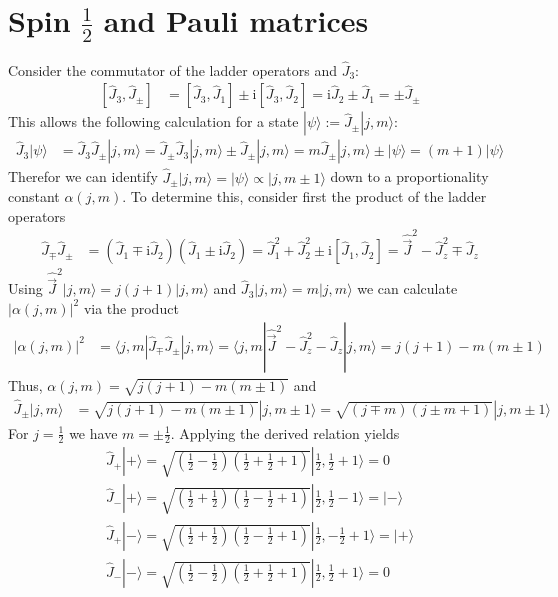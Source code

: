 \documentclass[english, parskip=full]{scrartcl}
\newcommand{\braket}{}
\newcommand{\kla}{}
\newcommand{\klam}{}
\newcommand{\Ket}{}
\def\I{\text{i}}
\begin{document}
\section{Spin $\frac{1}{2}$ and Pauli matrices}
Consider the commutator of the ladder operators and $\hat{J}_3$:
\begin{align*}
\klam\left[ {\hat{J}_3,\hat{J}_\pm} \right]&=\klam\left[ {\hat{J}_3,\hat{J}_1} \right]\pm\I\klam\left[ {\hat{J}_3,\hat{J}_2} \right]=\I\hat{J}_2\pm\hat{J}_1=\pm\hat{J}_\pm
\end{align*}
This allows the following calculation for a state $\Ket | {\psi} \rangle:=\hat{J}_\pm\Ket | {j,m} \rangle$:
\begin{align*}
\hat{J}_3\Ket | {\psi} \rangle&=\hat{J}_3\hat{J}_\pm\Ket | {j,m} \rangle=\hat{J}_\pm\hat{J}_3\Ket | {j,m} \rangle\pm\hat{J}_\pm\Ket | {j,m} \rangle=m\hat{J}_\pm\Ket | {j,m} \rangle\pm\Ket | {\psi} \rangle=(m+1)\Ket | {\psi} \rangle
\end{align*}
Therefor we can identify $\hat{J}_\pm\Ket | {j,m} \rangle=\Ket | {\psi} \rangle\propto\Ket | {j,m\pm 1} \rangle$ down to a proportionality constant $\alpha(j,m)$. To determine this, consider first the product of the ladder operators
\begin{align*}
\hat{J}_\mp\hat{J}_\pm&=(\hat{J}_1\mp\I\hat{J}_2)(\hat{J}_1\pm\I\hat{J}_2)=\hat{J}_1^2+\hat{J}_2^2\pm\I\klam\left[ {\hat{J}_1,\hat{J}_2} \right]=\hat{\vec{J}}^2-\hat{J}_z^2\mp\hat{J}_z
\end{align*}
Using $\hat{\vec{J}}^2\Ket | {j,m} \rangle=j(j+1)\Ket | {j,m} \rangle$ and $\hat{J}_3\Ket | {j,m} \rangle=m\Ket | {j,m} \rangle$ we can calculate $|\alpha(j,m)|^2$ via the product
\begin{align*}
|\alpha(j,m)|^2&=\braket\langle {j,m} | {\hat{J}_\mp\hat{J}_\pm} | {j,m}\rangle=\braket\langle {j,m} | {\hat{\vec{J}}^2-\hat{J}_z^2-\hat{J}_z} | {j,m}\rangle=j(j+1)-m(m\pm 1)
\end{align*}
Thus, $\alpha(j,m)=\sqrt{j(j+1)-m(m\pm 1)}$ and
\begin{align*}
\hat{J}_\pm\Ket | {j,m} \rangle&=\sqrt{j(j+1)-m(m\pm 1)}\Ket | {j,m\pm 1} \rangle=\sqrt{(j\mp m)(j\pm m+1)}\Ket | {j,m\pm 1} \rangle
\end{align*}
For $j=\frac{1}{2}$ we have $m=\pm\frac{1}{2}$. Applying the derived relation yields
\begin{align*}
\hat{J}_+\Ket | {+} \rangle=\sqrt{\kla\left( {\frac{1}{2}-\frac{1}{2}} \right)\kla\left( {\frac{1}{2}+\frac{1}{2}+1} \right)}\Ket | {\frac{1}{2},\frac{1}{2}+ 1} \rangle=0\\
\hat{J}_-\Ket | {+} \rangle=\sqrt{\kla\left( {\frac{1}{2}+\frac{1}{2}} \right)\kla\left( {\frac{1}{2}-\frac{1}{2}+1} \right)}\Ket | {\frac{1}{2},\frac{1}{2}- 1} \rangle=\Ket | {-} \rangle\\
\hat{J}_+\Ket | {-} \rangle=\sqrt{\kla\left( {\frac{1}{2}+\frac{1}{2}} \right)\kla\left( {\frac{1}{2}-\frac{1}{2}+1} \right)}\Ket | {\frac{1}{2},-\frac{1}{2}+ 1} \rangle=\Ket | {+} \rangle\\
\hat{J}_-\Ket | {-} \rangle=\sqrt{\kla\left( {\frac{1}{2}-\frac{1}{2}} \right)\kla\left( {\frac{1}{2}+\frac{1}{2}+1} \right)}\Ket | {\frac{1}{2},\frac{1}{2}+ 1} \rangle=0
\end{align*}
\end{document}

